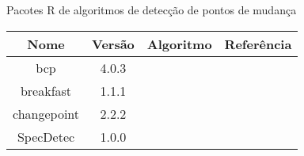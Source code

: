 \begin{quadro}[hbp]
\centering
\caption{Pacotes R de algoritmos de detecção de pontos de mudança \label{qua:ferramtas-cpd}}
    \begin{adjustbox}{max width=\textwidth}
    \begin{tabular}{ | c | c | p{5cm} | p{5cm} | } \hline
        \textbf{Nome}     & \textbf{Versão}      & \textbf{Algoritmo}     & \textbf{Referência} \\ \hline
        bcp & 4.0.3 &  & \cite{Emerson2007} \\ \hline
        breakfast & 1.1.1 &  & \cite{Fryzlewicz2017} \\ \hline
        changepoint & 2.2.2 &  & \cite{Eckley2016} \\ \hline
        SpecDetec & 1.0.0 &  & \cite{Uzai2018} \\ \hline
    \end{tabular}
    \end{adjustbox}
\end{quadro}